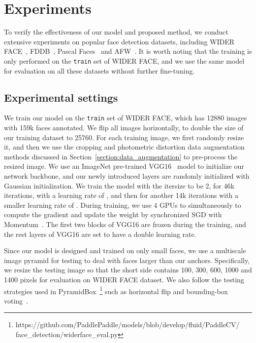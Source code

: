 \documentclass[10pt,twocolumn,letterpaper]{article}
\begin{document}
\section{Experiments}\label{sec:exp}
To verify the effectiveness of our model and proposed method, we conduct extensive experiments
on popular face detection datasets, including WIDER FACE~\cite{yang2016wider}, FDDB~\cite{fddbTech}, Pascal Faces~\cite{yan2014face} and AFW~\cite{zhu2012face}.
It is worth noting that the training is only performed on the \texttt{train} set of WIDER FACE,
and we use the same model for evaluation on all these datasets without further fine-tuning.
\subsection{Experimental settings}
We train our model on the \texttt{train} set of WIDER FACE, which has 12880 images with
159k faces annotated. We flip all images horizontally, to
double the size of our training dataset to 25760.
For each training image, we first randomly resize it,
and then we use the cropping and photometric distortion data
augmentation methods discussed in Section~\ref{section:data_augmentation} to pre-process
the resized image. We use an ImageNet pre-trained
VGG16~\cite{krizhevsky2012imagenet} model to initialize our network backbone, and our newly
introduced layers are randomly initialized with Gaussian initialization. We train the
model with the itersize to be 2, for 46k iterations, with a learning rate of , and
then for another 14k iterations
with a smaller learning rate of .
During training, we use 4 GPUs to simultaneously to compute the gradient and update the weight by
synchronized SGD with
Momentum~\cite{qian1999momentum}. The first two blocks of VGG16 are frozen during the training,
and the rest
layers of VGG16 are set to have a double learning rate.

Since our model is designed and trained on only small faces, we use a multiscale image
pyramid for testing to deal with faces larger than our anchors. Specifically, we resize
the testing image so that the short side contains 100, 300, 600, 1000 and 1400 pixels
for evaluation on WIDER FACE dataset. We also follow the testing strategies used in PyramidBox~\cite{Tang_2018_ECCV}\footnote{https://github.com/PaddlePaddle/models/blob/develop/fluid/PaddleCV/
face\_detection/widerface\_eval.py} such as horizontal flip and
bounding-box voting~\cite{gidaris2015object}.
\end{document}

